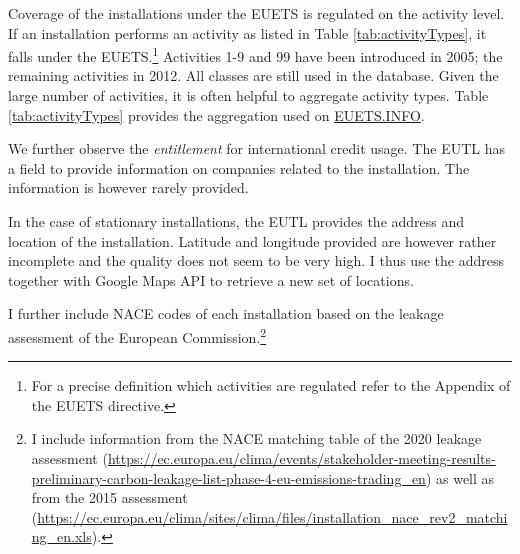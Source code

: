\documentclass[authoryear]{elsarticle}
\begin{document}
Coverage of the installations under the EUETS is regulated on the activity level. If an installation performs an activity as listed in Table \ref{tab:activityTypes}, it falls under the EUETS.\footnote{For a precise definition which activities are regulated refer to the Appendix of the EUETS directive.} Activities 1-9 and 99 have been introduced in 2005; the remaining activities in 2012. All classes are still used in the database. Given the large number of activities, it is often helpful to aggregate activity types. Table \ref{tab:activityTypes} provides the aggregation used on \href{https://www.euets.info}{EUETS.INFO}.

We further observe the \textit{entitlement} for international credit usage. The EUTL has a field to provide information on companies related to the installation. The information is however rarely provided.

In the case of stationary installations, the EUTL provides the address and location of the installation. Latitude and longitude provided are however rather incomplete and the quality does not seem to be very high. I thus use the address together with Google Maps API to retrieve a new set of locations. 

I further include NACE codes of each installation based on the leakage assessment of the European Commission.\footnote{I include information from the NACE matching table of the 2020 leakage assessment (\url{https://ec.europa.eu/clima/events/stakeholder-meeting-results-preliminary-carbon-leakage-list-phase-4-eu-emissions-trading_en}) as well as from the 2015 assessment (\url{https://ec.europa.eu/clima/sites/clima/files/installation_nace_rev2_matching_en.xls}).}
\end{document}

